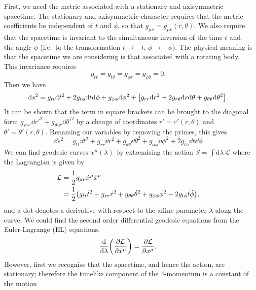 First, we need the metric associated with a stationary and axisymmetric spacetime. 
The stationary and axisymmetric character requires that the metric coefficients be independent of $t$ and $\phi$, so that $g_{\mu \nu} = g_{\mu \nu}(r,\theta)$.
We also require that the spacetime is invariant to the simultaneous inversion of the time $t$ and the angle $\phi$ (i.e.\ to the transformation $t \rightarrow -t$, $\phi \rightarrow -\phi$). 
The physical meaning is that the spacetime we are considering is that associated with a rotating body. 
This invariance requires 
\begin{equation}
	g_{tr} = g_{t \theta} = g_{\phi r} = g_{\phi \theta} = 0.
\end{equation}
Then we have 
\begin{equation}
	\dd s^2 = g_{tt}\dd t^2 + 2g_{t \phi} \dd t \dd \phi + g_{\phi \phi}\dd \phi^2 + \qty[ g_{rr}\dd r^2 + 2g_{r \theta} \dd r \dd \theta + g_{\theta \theta} \dd \theta^2 ].
\end{equation}
It can be shown \cite{Chandrasekhar:1985kt} that the term in square brackets can be brought to the diagonal form $g_{r'r'}\dd r'^2 +  g_{\theta' \theta'} \dd \theta'^2$ by a change of coordinates $r'=r'(r,\theta)$ and $\theta'=\theta'(r,\theta)$.
Renaming our variables by removing the primes, this gives
\begin{equation}
	\dd s^2 = g_{tt}\dd t^2 + g_{rr}\dd r^2 + g_{\theta \theta}\dd \theta^2 + g_{\phi \phi}\dd \phi^2 + 2g_{t \phi}\dd t\dd \phi
\end{equation}
We can find geodesic curves $x^\mu(\lambda)$ by extremising the action $S=\int\mathrm{d}\lambda\,\mathcal{L}$ where the Lagrangian is given by
\begin{align}
	\mathcal{L} &= \frac{1}{2}g_{\mu \nu} \dot{x}^\mu \dot{x}^\nu \\
	&= \frac{1}{2}\qty(g_{tt}\dot{t}^2 + g_{rr}\dot{r}^2 + g_{\theta \theta}\dot{\theta}^2 + g_{\phi \phi}\dot{\phi}^2 + 2g_{t \phi}\dot{t}\dot{\phi}), \nonumber
\end{align}
and a dot denotes a derivative with respect to the affine parameter $\lambda$ along the curve. 
We could find the second order differential geodesic equations from the Euler-Lagrange (EL) equations, 
\begin{gather} \label{eq:ELeqns_1}
	\dv{\lambda}(\pdv{\mathcal{L}}{\dot{x}^\mu}) = \pdv{\mathcal{L}}{x^\mu}.
\end{gather}
However, first we recognise that the spacetime, and hence the action, are stationary; therefore the timelike component of the 4-momentum is a constant of the motion
